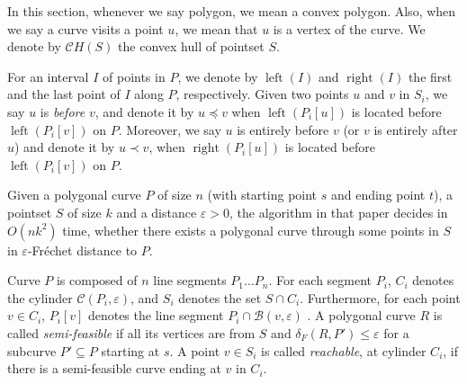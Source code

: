 \documentclass[a4paper,UKenglish]{lipics}
\newcommand{\lee}{\leqslant}
\newcommand{\eps}{\varepsilon}
\newcommand{\REM}[1]{}
\newcommand{\CR}{{\mathscr R}}
\newcommand{\CB}{{\mathscr B}}
\newcommand{\CC}{{\mathscr C}}
\newcommand{\PolSeg}{{P}}
\newcommand{\CH}{{\mathscr CH}}
\newcommand{\R}{\CR}
\newcommand{\Frechet}{Fr\'echet }
\newcommand{\distF}{\delta_F}
\DeclareMathOperator{\Left}{left}
\DeclareMathOperator{\Right}{right}
\newcommand{\Dir}{\overrightarrow}
\newcommand{\lei}{\prec}
\newcommand{\lex}{\preceq}
\newcommand{\pset}{S}
\begin{document}
In this section, whenever we say polygon, we mean 
a convex polygon. Also, when we 
say a curve visits a point $u$, we mean that 
$u$ is a vertex of the curve.
We denote by $\CH(\pset)$ the convex hull of pointset $\pset$.

For an interval $I$ of points in  $P$,
we denote by $\Left(I)$ and $\Right(I)$
the first and the last point of $I$ along $P$, respectively.
Given two points $u$ and $v$ in $\pset_i$, 
we say $u$ is {\em before\/} $v$, and denote it by $u \lex v$ when
$\Left(P_i[u])$ is located before $\Left(P_i[v])$ on $P$.
Moreover, 
we say $u$ is entirely before $v$ (or $v$ is entirely after $u$) 
and denote it by $u \lei v$, when $\Right(P_i[u])$ is located before $\Left(P_i[v])$ on $P$.

\REM{
Consider two points $u \in \R_i$
and $v \in \R_j$, $i<j$. 
We say $v$ is reachable from $u$ (or $u$ can reach  $v$), 
if a semi-feasible curve $R$ exists 
which ends at point $v$ and visits $u$.
Furthermore, we say point $u$ can directly reach  $v$,
if $u$ is a reachable point and $u$
reaches $v$  via edge $\Dir{uv}$.
We call an  edge $\Dir{uv}$ between points $u$ and $v$, 
 a {\em forward edge} when
$u$ and $v$ are in $\R_i$ and 
($u \lei v$ or $u \lex v$). In addition, 
if $u \in \R_i$ 
and $v \in \R_j$, $i < j$, 
and point $u$ reaches $v$ via edge $\Dir{uv}$, 
then we call that edge a forward edge too.
We call an  edge $\Dir{uv}$, a {\em backward edge} if $u$ and $v$ are both in $\R_i$ and 
$v \lei u$. 

Let $start(\pi)$ and 
$end(\pi)$ denote the start and end point of polygonal chain 
$\pi$.
}















\vspace{0.3 in}

Given a polygonal curve $P$ of size $n$ (with 
starting point $s$ and ending point $t$), 
a pointset $\pset$ of size $k$
and a distance $\eps>0$, 
the algorithm in that paper decides in $O(nk^2)$ time,
whether there exists a polygonal curve through some points 
in $\pset$ in $\eps$-\Frechet distance to 
$P$. 

Curve $P$ is composed of $n$ 
line segments $\PolSeg_1 \ldots \PolSeg_{n}$. 
For each segment $\PolSeg_i$,
$C_i$ denotes the cylinder $\CC(\PolSeg_i, \eps)$,
and $\pset_i$ denotes the set $\pset \cap C_i$.
Furthermore, for each point $v \in C_i$,
$\PolSeg_i[v]$  denotes the line segment $\PolSeg_i \cap \CB(v,\eps)$ \cite{cccg11}.
A polygonal curve $R$ is called \emph{semi-feasible} if all its vertices are from $\pset$ and 
$\distF(R, P') \lee \eps$ for a subcurve $P' \subseteq  P$  starting at $s$.
A point $v \in \pset_i$ is called \emph{reachable}, at cylinder $C_i$,
if there is a semi-feasible curve ending at $v$ in $C_i$.
\end{document}
